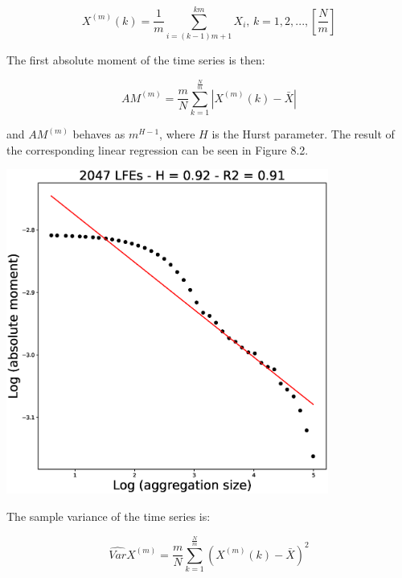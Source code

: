 \documentclass[workdone.tex]{subfiles}
\begin{document}
\begin{equation}
X^{\left( m \right)} \left( k \right) = \frac{1}{m} \sum_{i = \left( k - 1 \right) m + 1}^{k m} X_i \text{, } k = 1 , 2 , ... , \left[ \frac{N}{m} \right]
\end{equation}

The first absolute moment of the time series is then:

\begin{equation}
AM^{\left( m \right)} = \frac{m}{N} \sum_{k = 1}^{\frac{N}{m}} \left| X^{\left( m \right)} \left( k \right) - \bar{X} \right|
\end{equation}

and $AM^{\left( m \right)}$ behaves as $m^{H - 1}$, where $H$ is the Hurst parameter. The result of the corresponding linear regression can be seen in Figure 8.2.

\begin{center}
\includegraphics[width=300pt, trim={0cm 0cm 0cm 0cm},clip]{Figures/longrange/absolutevalue.eps}
\captionsetup{type=figure}
\end{center}

The sample variance of the time series is:

\begin{equation}
\hat{Var} X^{\left( m \right)} = \frac{m}{N} \sum_{k = 1}^{\frac{N}{m}} \left( X^{\left( m \right)} \left( k \right) - \bar{X} \right) ^2
\end{equation}
\end{document}
